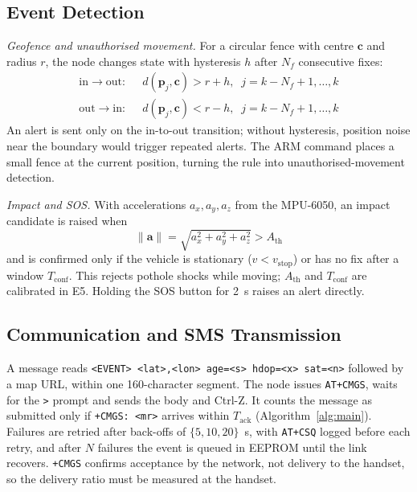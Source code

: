 \documentclass[conference]{IEEEtran}
\begin{document}
\subsection{Event Detection}\label{sec:events}
\textit{Geofence and unauthorised movement.} For a circular fence with centre $\mathbf{c}$ and radius $r$, the node changes state with hysteresis $h$ after $N_f$ consecutive fixes:
\begin{equation}
\begin{aligned}
\text{in}\rightarrow\text{out}:&\;\; d(\mathbf{p}_j,\mathbf{c}) > r+h,\;\; j=k-N_f+1,\dots,k\\
\text{out}\rightarrow\text{in}:&\;\; d(\mathbf{p}_j,\mathbf{c}) < r-h,\;\; j=k-N_f+1,\dots,k
\end{aligned}
\label{eq:fence}
\end{equation}
An alert is sent only on the in-to-out transition; without hysteresis, position noise near the boundary would trigger repeated alerts. The \textsc{ARM} command places a small fence at the current position, turning the rule into unauthorised-movement detection.

\textit{Impact and SOS.} With accelerations $a_x,a_y,a_z$ from the MPU-6050, an impact candidate is raised when
\begin{equation}
\|\mathbf{a}\| = \sqrt{a_x^2+a_y^2+a_z^2} > A_{\mathrm{th}}
\label{eq:imp}
\end{equation}
and is confirmed only if the vehicle is stationary ($v<v_{\mathrm{stop}}$) or has no fix after a window $T_{\mathrm{conf}}$. This rejects pothole shocks while moving; $A_{\mathrm{th}}$ and $T_{\mathrm{conf}}$ are calibrated in E5. Holding the SOS button for 2~s raises an alert directly.

\subsection{Communication and SMS Transmission}
A message reads \texttt{<EVENT> <lat>,<lon> age=<s> hdop=<x> sat=<n>} followed by a map URL, within one 160-character segment. The node issues \texttt{AT+CMGS}, waits for the \texttt{>} prompt and sends the body and Ctrl-Z. It counts the message as submitted only if \texttt{+CMGS: <mr>} arrives within $T_{\mathrm{ack}}$ (Algorithm~\ref{alg:main}). Failures are retried after back-offs of $\{5,10,20\}$~s, with \texttt{AT+CSQ} logged before each retry, and after $N$ failures the event is queued in EEPROM until the link recovers. \texttt{+CMGS} confirms acceptance by the network, not delivery to the handset, so the delivery ratio must be measured at the handset.
\end{document}
